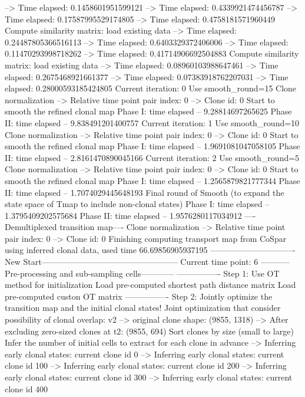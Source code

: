 \documentclass[letterpaper,10pt,english]{sphinxmanual}
\begin{document}
{\begin{sphinxVerbatim}[commandchars=\\\{\}]
--> Time elapsed:  0.1458601951599121
--> Time elapsed:  0.4339921474456787
--> Time elapsed:  0.17587995529174805
--> Time elapsed:  0.4758181571960449
Compute similarity matrix: load existing data
--> Time elapsed:  0.24487805366516113
--> Time elapsed:  0.6403329372406006
--> Time elapsed:  0.11470293998718262
--> Time elapsed:  0.41714906692504883
Compute similarity matrix: load existing data
--> Time elapsed:  0.08960103988647461
--> Time elapsed:  0.2675468921661377
--> Time elapsed:  0.07383918762207031
--> Time elapsed:  0.28000593185424805
Current iteration: 0
Use smooth\_round=15
Clone normalization
--> Relative time point pair index: 0
--> Clone id: 0
Start to smooth the refined clonal map
Phase I: time elapsed --  9.28814697265625
Phase II: time elapsed --  9.838491201400757
Current iteration: 1
Use smooth\_round=10
Clone normalization
--> Relative time point pair index: 0
--> Clone id: 0
Start to smooth the refined clonal map
Phase I: time elapsed --  1.9691081047058105
Phase II: time elapsed --  2.8161470890045166
Current iteration: 2
Use smooth\_round=5
Clone normalization
--> Relative time point pair index: 0
--> Clone id: 0
Start to smooth the refined clonal map
Phase I: time elapsed --  1.2565879821777344
Phase II: time elapsed --  1.7074029445648193
Final round of Smooth (to expand the state space of Tmap to include non-clonal states)
Phase I: time elapsed --  1.3795409202575684
Phase II: time elapsed --  1.9576280117034912
----Demultiplexed transition map----
Clone normalization
--> Relative time point pair index: 0
--> Clone id: 0
Finishing computing transport map from CoSpar using inferred clonal data, used time 66.69856905937195
-------------------------------New Start--------------------------------------------------
Current time point: 6
-----------Pre-processing and sub-sampling cells------------
----------------
Step 1: Use OT method for initialization
Load pre-computed shortest path distance matrix
Load pre-computed custon OT matrix
----------------
Step 2: Jointly optimize the transition map and the initial clonal states!
Joint optimization that consider possibility of clonal overlap: v2
--> original clone shape: (9855, 1318)
--> After excluding zero-sized clones at t2: (9855, 694)
Sort clones by size (small to large)
Infer the number of initial cells to extract for each clone in advance
--> Inferring early clonal states: current clone id 0
--> Inferring early clonal states: current clone id 100
--> Inferring early clonal states: current clone id 200
--> Inferring early clonal states: current clone id 300
--> Inferring early clonal states: current clone id 400

\end{sphinxVerbatim}}
\end{document}
